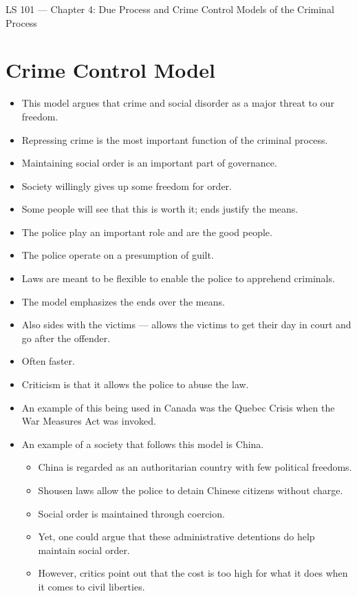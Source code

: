 \documentclass{article}
\author{Clement Tsang}
\begin{document}
\begin{center}
    \Large{LS 101 --- Chapter 4: Due Process and Crime Control Models of the Criminal Process}
\end{center}

\section{Crime Control Model}
\begin{itemize}
    \item This model argues that crime and social disorder as a major threat to our freedom.
    \item Repressing crime is the most important function of the criminal process.
    \item Maintaining social order is an important part of governance.
    \item Society willingly gives up some freedom for order.
    \item Some people will see that this is worth it; ends justify the means.
    \item The police play an important role and are the good people.
    \item The police operate on a presumption of guilt.
    \item Laws are meant to be flexible to enable the police to apprehend criminals.
    \item The model emphasizes the ends over the means.
    \item Also sides with the victims --- allows the victims to get their day in court and go after the offender.
    \item Often faster.
    \item Criticism is that it allows the police to abuse the law.
    \item An example of this being used in Canada was the Quebec Crisis when the War Measures Act was invoked.
    \item An example of a society that follows this model is China.
        \begin{itemize}
            \item China is regarded as an authoritarian country with few political freedoms.
            \item Shousen laws allow the police to detain Chinese citizens without charge.
            \item Social order is maintained through coercion.
            \item Yet, one could argue that these administrative detentions do help maintain social order.
            \item However, critics point out that the cost is too high for what it does when it comes to civil liberties.
        \end{itemize}
\end{itemize}
\end{document}
